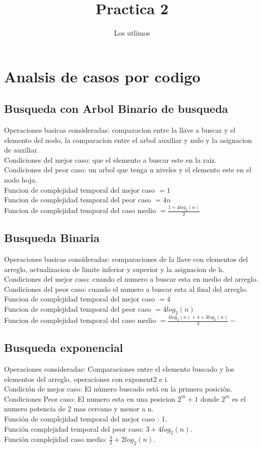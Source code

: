 \documentclass[12pt]{report}
\title{Practica 2}
\author{Los utlimos}
\begin{document}
\maketitle
\section*{Analsis de casos por codigo}
\subsection*{Busqueda con Arbol Binario de busqueda}
Operaciones basicas consideradas: comparacion entre la llave a buscar y el elemento del nodo, la comparacion entre el arbol auxiliar y nulo y la asignacion de auxiliar.\\
Condiciones del mejor caso: que el elemento a buscar este en la raiz.\\
Condiciones del peor caso: un arbol que tenga n niveles y el elemento este en el nodo hoja.\\
Funcion de complejidad temporal del mejor caso $= 1$\\
Funcion de complejidad temporal del peor caso $= 4n$\\
Funcion de complejidad temporal del caso medio $= \frac{1+4log_2(n)}{2}$
\subsection*{Busqueda Binaria}
Operaciones basicas consideradas: comparaciones de la llave con elementos del arreglo, actualizacion de limite inferior y superior y la asignacion de h.\\
Condiciones del mejor caso: cuando el numero a buscar esta en medio del arreglo.\\
Condiciones del peor caso: cuando el numero a buscar esta al final del arreglo.\\
Funcion de complejidad temporal del mejor caso $= 4$\\
Funcion de complejidad temporal del peor caso $= 4log_2(n)$\\
Funcion de complejidad temporal del caso medio $= \frac{4log_2(n) + 4 + 3log_2(n)}{3}-$
\subsection*{Busqueda exponencial}
Operaciones consideradas: Comparaciones entre el elemento buscado y los elementos del arreglo. operaciones con exponent2 e i.\\
Condición de mejor caso: El número buscado está en la primera posición. \\
Condiciones Peor caso: El numero esta en una posicion $2^m + 1$ donde $2^m$ es el numero potencia de 2 mas cercano y menor a n. \\
Función de complejidad temporal del mejor caso : 1.\\
Función complejidad temporal del peor caso: $3+4log_2(n)$. \\
Función complejidad caso medio: $\frac{3}{2}+2log_2(n)$.\\
\end{document}
